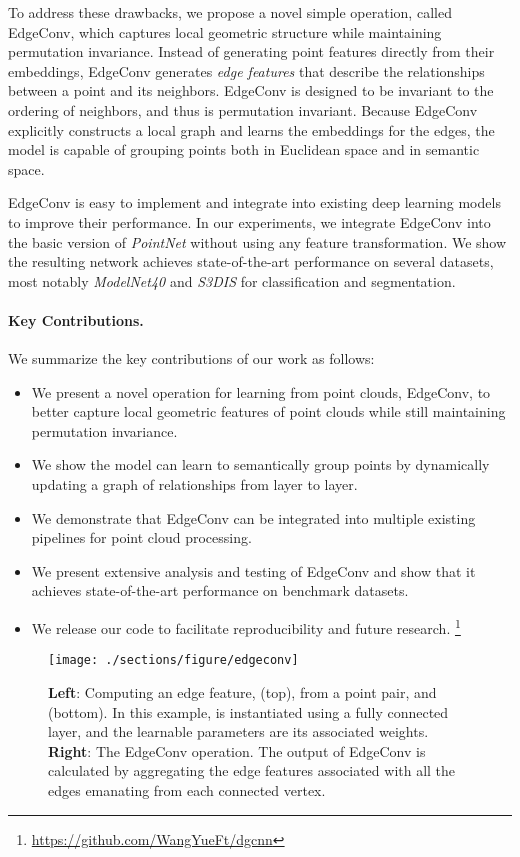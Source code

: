 \documentclass[acmtog]{acmart}
\begin{document}
To address these drawbacks, we propose a novel simple operation, called EdgeConv, which captures local geometric structure while maintaining permutation invariance. Instead of generating point features directly from their embeddings, EdgeConv generates \textit{edge features} that describe the relationships between a point and its neighbors. EdgeConv is designed to be invariant to the ordering of neighbors, and thus is permutation invariant. Because EdgeConv explicitly constructs a local graph and learns the embeddings for the edges, the model is capable of grouping points both in Euclidean space and in semantic space.

EdgeConv is easy to implement and integrate into existing deep learning models to improve their performance. In our experiments, we integrate EdgeConv into the basic version of \textit{PointNet} without using any feature transformation. We show the resulting network achieves state-of-the-art performance on several datasets, most notably \textit{ModelNet40} and \textit{S3DIS} for classification and segmentation.

\paragraph*{Key Contributions.} We summarize the key contributions of our work as follows:
  \begin{itemize}[leftmargin=*]
  \item  We present a novel operation for learning from point clouds, EdgeConv, to better capture local geometric features of point clouds while still maintaining permutation invariance.
  \item  We show the model can learn to semantically group points by dynamically updating a graph of relationships from layer to layer.
  \item  We demonstrate that EdgeConv can be integrated into multiple existing pipelines for point cloud processing.
  \item  We present extensive analysis and testing of EdgeConv and show that it achieves state-of-the-art performance on benchmark datasets.
  \item We release our code to facilitate reproducibility and future research. \footnote{\url{https://github.com/WangYueFt/dgcnn}}
\end{itemize}

\begin{figure*}[t!]
  \centering
  \texttt{[image: ./sections/figure/edgeconv]}
  \caption{\textbf{Left}: Computing an edge feature,  (top), from a point pair,  and  (bottom). In this example,  is instantiated using a fully connected layer, and the learnable parameters are its associated weights.  \textbf{Right}: The EdgeConv operation. The output of EdgeConv is calculated by aggregating the edge features associated with all the edges emanating from each connected vertex.}
  \label{fig:edgeconv}
\end{figure*}
\end{document}
